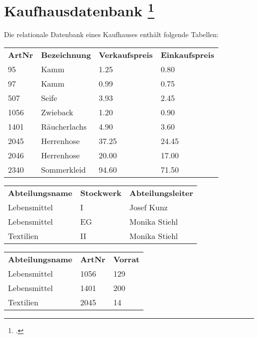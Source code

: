 \documentclass{lehramt-informatik-aufgabe}
\begin{document}

\section{Kaufhausdatenbank
\footcite[Aufgabe 1: Kaufhausdatenbank - einfacher Einstieg]{db:ab:2}
}

Die relationale Datenbank eines Kaufhauses enthält folgende Tabellen:


\begin{tabular}{llll}
\textbf{ArtNr} & \textbf{Bezeichnung}  & \textbf{Verkaufspreis} & \textbf{Einkaufspreis} \\
95    & Kamm         & 1.25          & 0.80          \\
97    & Kamm         & 0.99          & 0.75          \\
507   & Seife        & 3.93          & 2.45          \\
1056  & Zwieback     & 1.20          & 0.90          \\
1401  & Räucherlachs & 4.90          & 3.60          \\
2045  & Herrenhose   & 37.25         & 24.45         \\
2046  & Herrenhose   & 20.00         & 17.00         \\
2340  & Sommerkleid  & 94.60         & 71.50
\end{tabular}


\begin{tabular}{lll}
\textbf{Abteilungsname} & \textbf{Stockwerk} & \textbf{Abteilungsleiter} \\
Lebensmittel   & I         & Josef Kunz       \\
Lebensmittel   & EG        & Monika Stiehl    \\
Textilien      & II        & Monika Stiehl
\end{tabular}


\begin{tabular}{lll}
\textbf{Abteilungsname}  & \textbf{ArtNr} & \textbf{Vorrat} \\
Lebensmittel    & 1056  & 129    \\
Lebensmittel    & 1401  & 200    \\
Textilien       & 2045  & 14
\end{tabular}
\end{document}
